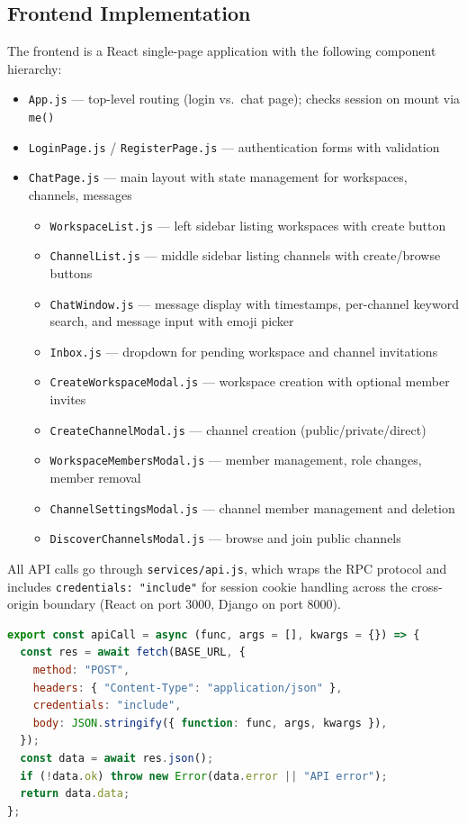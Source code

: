 \documentclass[11pt]{article}
\begin{document}
\subsection{Frontend Implementation}

The frontend is a React single-page application with the following component hierarchy:

\begin{itemize}
    \item \texttt{App.js} --- top-level routing (login vs.\ chat page); checks session on mount via \texttt{me()}
    \item \texttt{LoginPage.js} / \texttt{RegisterPage.js} --- authentication forms with validation
    \item \texttt{ChatPage.js} --- main layout with state management for workspaces, channels, messages
    \begin{itemize}
        \item \texttt{WorkspaceList.js} --- left sidebar listing workspaces with create button
        \item \texttt{ChannelList.js} --- middle sidebar listing channels with create/browse buttons
        \item \texttt{ChatWindow.js} --- message display with timestamps, per-channel keyword search, and message input with emoji picker
        \item \texttt{Inbox.js} --- dropdown for pending workspace and channel invitations
        \item \texttt{CreateWorkspaceModal.js} --- workspace creation with optional member invites
        \item \texttt{CreateChannelModal.js} --- channel creation (public/private/direct)
        \item \texttt{WorkspaceMembersModal.js} --- member management, role changes, member removal
        \item \texttt{ChannelSettingsModal.js} --- channel member management and deletion
        \item \texttt{DiscoverChannelsModal.js} --- browse and join public channels
    \end{itemize}
\end{itemize}

All API calls go through \texttt{services/api.js}, which wraps the RPC protocol and includes \texttt{credentials: "include"} for session cookie handling across the cross-origin boundary (React on port 3000, Django on port 8000).

\begin{lstlisting}[language=JavaScript]
export const apiCall = async (func, args = [], kwargs = {}) => {
  const res = await fetch(BASE_URL, {
    method: "POST",
    headers: { "Content-Type": "application/json" },
    credentials: "include",
    body: JSON.stringify({ function: func, args, kwargs }),
  });
  const data = await res.json();
  if (!data.ok) throw new Error(data.error || "API error");
  return data.data;
};
\end{lstlisting}
\end{document}
